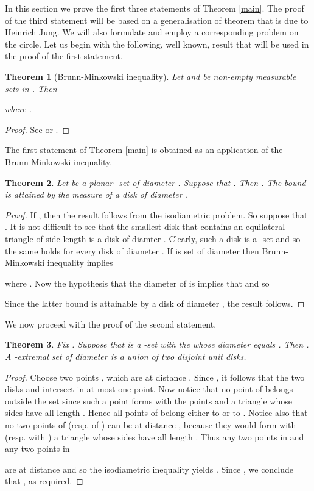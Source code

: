 \documentclass[12pt]{article}
\newtheorem{thm}{Theorem}[section]
\begin{document}
In this section we prove the first three statements of Theorem \ref{main}. 
The proof of the third statement will be based on a generalisation of theorem that is due to Heinrich Jung. 
We will also formulate and employ a 
corresponding problem on the circle. 
Let us begin with the following, well known, result that will be used in the proof of the first statement. 


\begin{thm}[Brunn-Minkowski inequality] Let  and  be non-empty measurable sets in . 
Then

where .
\end{thm}
\begin{proof} See \cite{Gruber} or \cite{Matousek}.
\end{proof}

The first statement of Theorem \ref{main} is obtained as an 
application of the Brunn-Minkowski inequality. 

\begin{thm} Let  be a planar -set of diameter . 
Suppose that . 
Then . The bound is attained by
the measure of a disk of diameter . 
\end{thm}
\begin{proof} If , then the result follows from the isodiametric problem.
So suppose that . 
It is not difficult to see that the smallest disk that contains
an equilateral triangle of side length  is a disk of diamter . 
Clearly, such a disk is a -set and so the same holds for every disk of diameter
.
If  is set of diameter  then Brunn-Minkowski inequality implies 

where . Now the hypothesis that
the diameter of  is  implies that  and so

Since the latter bound is attainable by a disk of diameter , the result follows.
\end{proof}

We now proceed with the proof of the second statement. 

\begin{thm}
\label{mainprop} Fix . Suppose that  is a -set with the
whose diameter equals .
Then  . A -extremal set of diameter  is
a union of two disjoint unit disks. 
\end{thm}
\begin{proof} Choose two points , which are at distance .
Since , it follows that the two disks  and  intersect in at most one point.
Now notice that no point of  belongs outside the set  since such a point 
forms with the points  and  a triangle whose sides have all length . Hence all points
of  belong  either to  or to . 
Notice also that no two points of  (resp. of )
can be at distance , because they would form with  (resp. with )
a triangle whose sides have all length . Thus any two points in  and any two points in 

are at distance  and so the isodiametric inequality yields
.
Since  , we conclude that 
, as required.
\end{proof}
\end{document}
